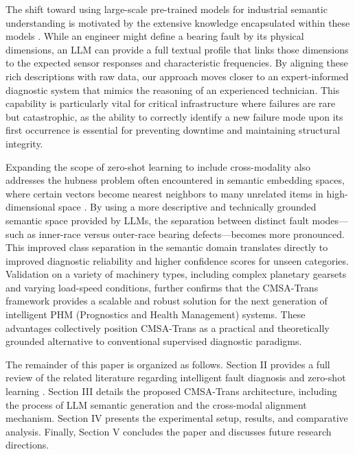 The shift toward using large-scale pre-trained models for industrial semantic understanding is motivated by the extensive knowledge encapsulated within these models \cite{zhao2023brain}. While an engineer might define a bearing fault by its physical dimensions, an LLM can provide a full textual profile that links those dimensions to the expected sensor responses and characteristic frequencies. By aligning these rich descriptions with raw data, our approach moves closer to an expert-informed diagnostic system that mimics the reasoning of an experienced technician. This capability is particularly vital for critical infrastructure where failures are rare but catastrophic, as the ability to correctly identify a new failure mode upon its first occurrence is essential for preventing downtime and maintaining structural integrity.

Expanding the scope of zero-shot learning to include cross-modality also addresses the hubness problem often encountered in semantic embedding spaces, where certain vectors become nearest neighbors to many unrelated items in high-dimensional space \cite{radovanovic2010hubs}. By using a more descriptive and technically grounded semantic space provided by LLMs, the separation between distinct fault modes---such as inner-race versus outer-race bearing defects---becomes more pronounced. This improved class separation in the semantic domain translates directly to improved diagnostic reliability and higher confidence scores for unseen categories. Validation on a variety of machinery types, including complex planetary gearsets and varying load-speed conditions, further confirms that the CMSA-Trans framework provides a scalable and robust solution for the next generation of intelligent PHM (Prognostics and Health Management) systems. These advantages collectively position CMSA-Trans as a practical and theoretically grounded alternative to conventional supervised diagnostic paradigms.

The remainder of this paper is organized as follows. Section II provides a full review of the related literature regarding intelligent fault diagnosis and zero-shot learning \cite{li2022zero}. Section III details the proposed CMSA-Trans architecture, including the process of LLM semantic generation and the cross-modal alignment mechanism. Section IV presents the experimental setup, results, and comparative analysis. Finally, Section V concludes the paper and discusses future research directions.
